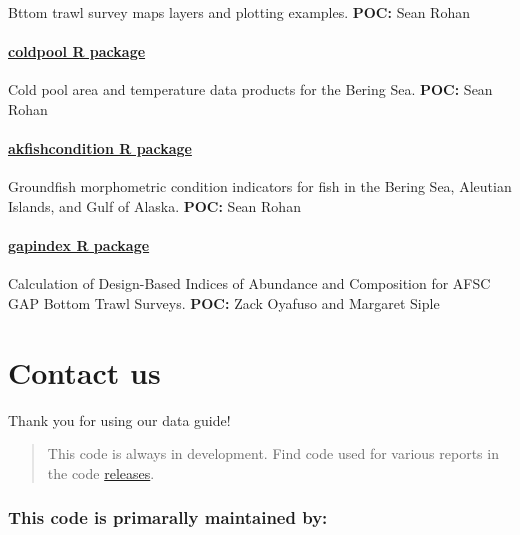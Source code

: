 \documentclass[
  letterpaper,
  oneside,
  open=any]{scrbook}
\begin{document}
Bttom trawl survey maps layers and plotting examples. \textbf{POC:} Sean
Rohan

\hypertarget{coldpool-r-package}{%
\subsection{\texorpdfstring{\href{https://github.com/afsc-gap-products/coldpool}{coldpool
R package}}{coldpool R package}}\label{coldpool-r-package}}

Cold pool area and temperature data products for the Bering Sea.
\textbf{POC:} Sean Rohan

\hypertarget{akfishcondition-r-package}{%
\subsection{\texorpdfstring{\href{https://github.com/afsc-gap-products/akfishcondition}{akfishcondition
R
package}}{akfishcondition R package}}\label{akfishcondition-r-package}}

Groundfish morphometric condition indicators for fish in the Bering Sea,
Aleutian Islands, and Gulf of Alaska. \textbf{POC:} Sean Rohan

\hypertarget{gapindex-r-package}{%
\subsection{\texorpdfstring{\href{https://github.com/afsc-gap-products/gapindex}{gapindex
R package}}{gapindex R package}}\label{gapindex-r-package}}

Calculation of Design-Based Indices of Abundance and Composition for
AFSC GAP Bottom Trawl Surveys. \textbf{POC:} Zack Oyafuso and Margaret
Siple

\part{Contact us}

Thank you for using our data guide!

\begin{quote}
This code is always in development. Find code used for various reports
in the code
\href{https://github.com/afsc-gap-products/gap_products/releases}{releases}.
\end{quote}

\hypertarget{this-code-is-primarally-maintained-by}{%
\section*{This code is primarally maintained
by:}\label{this-code-is-primarally-maintained-by}}
\end{document}
